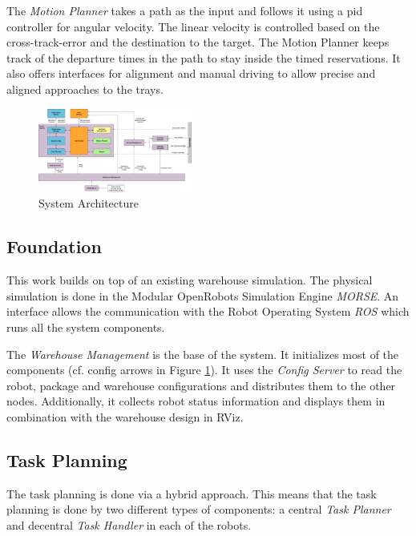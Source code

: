 \documentclass[journal]{IEEEtran}
\begin{document}
The \emph{Motion Planner} takes a path as the input and follows it using a pid controller for angular velocity. The linear velocity is controlled based on the cross-track-error and the destination to the target. The Motion Planner keeps track of the departure times in the path to stay inside the timed reservations. It also offers interfaces for alignment and manual driving to allow precise and aligned approaches to the trays.

\begin{figure}[h]
	\centering
	\includegraphics[width=0.45\textwidth]{resources/system_architecture}
	\caption{System Architecture}
	\label{fig:system_architecture}
\end{figure}

\subsection{Foundation}
\label{subsec:foundation}
This work builds on top of an existing warehouse simulation. The physical simulation is done in the Modular OpenRobots Simulation Engine \emph{MORSE}. An interface allows the communication with the Robot Operating System \emph{ROS} which runs all the system components.

The \emph{Warehouse Management} is the base of the system. It initializes most of the components (cf. config arrows in Figure \ref{fig:system_architecture}). It uses the \emph{Config Server} to read the robot, package and warehouse configurations and distributes them to the other nodes. Additionally, it collects robot status information and displays them in combination with the warehouse design in RViz.





\subsection{Task Planning}
\label{subsec:task_planning}
The task planning is done via a hybrid approach. This means that the task planning is done by two different types of components: a central \textit{Task Planner} and decentral \textit{Task Handler} in each of the robots.
\end{document}
